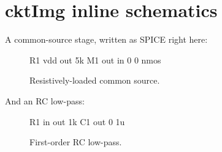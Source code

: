 \documentclass{article}
\begin{document}
\section*{cktImg inline schematics}

A common-source stage, written as SPICE right here:

\begin{figure}[h]
  \centering
  \begin{cktcircuit}
  R1 vdd out 5k
  M1 out in 0 0 nmos
  \end{cktcircuit}
  \caption{Resistively-loaded common source.}
\end{figure}

And an RC low-pass:

\begin{figure}[h]
  \centering
  \begin{cktcircuit}
  R1 in out 1k
  C1 out 0 1u
  \end{cktcircuit}
  \caption{First-order RC low-pass.}
\end{figure}
\end{document}
